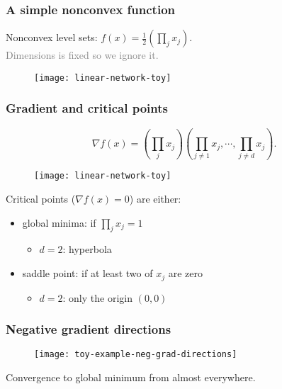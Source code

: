 \documentclass[aspectratio=149]{beamer}
\begin{document}
\begin{frame}
  \frametitle{A simple nonconvex function}
  Nonconvex level sets: $f(x)= \frac12 {\left( \prod_j x_j \right)}$. \\
  \textcolor{gray}{Dimensions is fixed so we ignore it.}

  \begin{figure}[ht]
    \centering
    \texttt{[image: linear-network-toy]}
  \end{figure}
\end{frame}


\begin{frame}
  \frametitle{Gradient and critical points}

  \begin{equation}
    \nabla f(x) = \left( \prod_j x_j \right) \left( \prod_{j\neq1} x_j, \cdots, \prod_{j\neq d}x_j \right).
  \end{equation}
  \begin{minipage}{0.5\textwidth}
    \begin{figure}[ht]
      \centering
      \texttt{[image: linear-network-toy]}
    \end{figure}
  \end{minipage}
  \begin{minipage}{0.45\textwidth}
    Critical points ($\nabla f(x) = 0$) are either:
    \begin{itemize}
      \item global minima: if $\prod_j x_j = 1$
            \begin{itemize}
              \item $d=2$: hyperbola
            \end{itemize}
      \item saddle point: if at least two of $x_j$ are zero
            \begin{itemize}
              \item $d=2$: only the origin $(0,0)$
            \end{itemize}
    \end{itemize}
  \end{minipage}
\end{frame}


\begin{frame}
  \frametitle{Negative gradient directions}
  \begin{figure}[ht]
    \centering
    \texttt{[image: toy-example-neg-grad-directions]}
  \end{figure}
  Convergence to global minimum from almost everywhere.
\end{frame}
\end{document}
